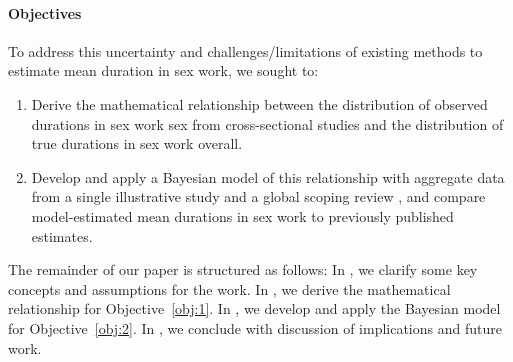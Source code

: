 \paragraph{Objectives}
To address this uncertainty
and challenges/limitations of existing methods to estimate mean duration in sex work,
we sought to:
\begin{enumerate}
  \item \label{obj:1}
        Derive the mathematical relationship between
        the distribution of observed durations in sex work sex from cross-sectional studies and
        the distribution of true durations in sex work overall.
  \item \label{obj:2}
        Develop and apply a Bayesian model of this relationship with aggregate data from
        a single illustrative study \cite{Baral2014} and
        a global scoping review \cite{Fazito2012},
        and compare model-estimated mean durations in sex work to previously published estimates.
\end{enumerate}
The remainder of our paper is structured as follows:
In , we clarify some key concepts and assumptions for the work.
In , we derive the mathematical relationship for Objective~\ref{obj:1}.
In , we develop and apply the Bayesian model for Objective~\ref{obj:2}.
In , we conclude with discussion of implications and future work.
